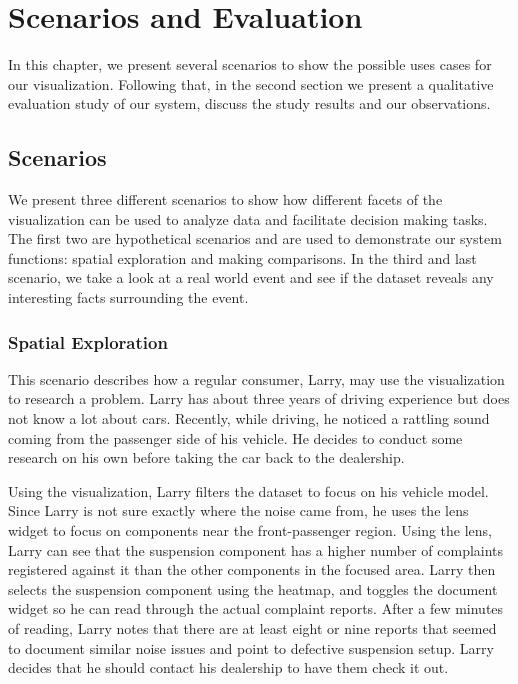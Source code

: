 
\chapter{Scenarios and Evaluation}
In this chapter, we present several scenarios to show the possible uses cases
for our visualization. Following that, in the second section we present a
qualitative evaluation study of our system, discuss the study results and our
observations.

\section{Scenarios}
We present three different scenarios to show how different facets of the
visualization can be used to analyze data and facilitate decision making tasks.
The first two are hypothetical scenarios and are used to demonstrate our system
functions: spatial exploration and making comparisons. In the third and last
scenario, we take a look at a real world event and see if the dataset reveals
any interesting facts surrounding the event.

 
\subsection{Spatial Exploration}
This scenario describes how a regular consumer, Larry, may use the 
visualization to research a problem. Larry has about three years of driving 
experience but does not know a lot about cars. Recently, while driving, he 
noticed a rattling sound coming from the passenger side of his vehicle. 
He decides to conduct some research on his own before taking the car back 
to the dealership.

Using the visualization, Larry filters the dataset to focus on his
vehicle model. Since Larry is not sure exactly where the noise came from, 
he uses the lens widget to focus on components near the front-passenger 
region. Using the lens, Larry can see that the suspension component has a
higher number of complaints registered against it than the other components 
in the focused area. Larry then selects the suspension component using 
the heatmap, and toggles the document widget so he can read through the 
actual complaint reports. After a few minutes of reading, Larry notes that
there are at least eight or nine reports that seemed to document similar noise 
issues and point to defective suspension setup. Larry decides that he 
should contact his dealership to have them check it out.

